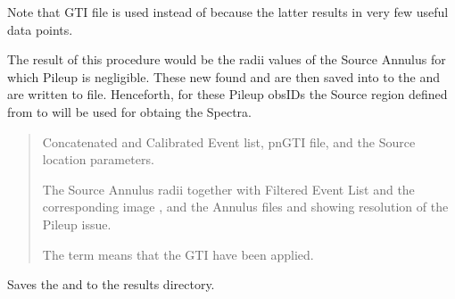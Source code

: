 \documentclass[letterpaper,10pt,english]{sphinxmanual}
\begin{document}
\begin{fulllineitems}
\begin{fulllineitems}
\sphinxAtStartPar
Note that  GTI file is used instead of 
because the latter results in very few useful data points.

\sphinxAtStartPar
The result of this procedure would be the radii values of the Source
Annulus for which Pile\sphinxhyphen{}up is negligible. These new found  and 
are then saved into to the  and are written to 
file. Henceforth, for these Pile\sphinxhyphen{}up obsIDs the Source region defined
from  to  will be used for obtaing the Spectra.
\begin{quote}\begin{description}
\sphinxAtStartPar
Concatenated and Calibrated Event list, pnGTI file,
 and the Source location parameters.

\sphinxAtStartPar
The Source Annulus radii together with Filtered Event List
 and the corresponding image
, and the Annulus files
 and 
showing resolution of the Pile\sphinxhyphen{}up issue.

\sphinxAtStartPar
The term  means that the GTI have been applied.

\end{description}\end{quote}

\end{fulllineitems}


\begin{fulllineitems}
\label{\detokenize{xmmPipeline:xmmPipeline.epicPileup.epicPileup.save_pileUpResults}}
\pysigstartsignatures
{}
\pysigstopsignatures
\sphinxAtStartPar
Saves the  and 
to the results directory.

\end{fulllineitems}


\end{fulllineitems}
\end{document}
